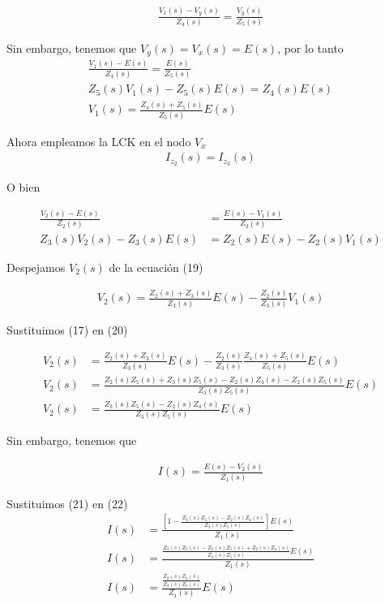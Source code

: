 \documentclass{article}
\begin{document}
\begin{align}
	\frac{V_1(s) - V_y(s)}{Z_4(s)} = \frac{V_y(s)}{Z_5(s)}
\end{align}

Sin embargo, tenemos que $V_y(s) = V_x(s) = E(s)$, por lo tanto
\begin{align}
	\frac{V_1(s) - E(s)}{Z_4(s)} = \frac{E(s)}{Z_5(s)} \nonumber \\
	Z_5(s)V_1(s) - Z_5(s)E(s) = Z_4(s)E(s) \nonumber \\
	V_1(s) = \frac{Z_4(s) + Z_5(s)}{Z_5(s)}E(s)
\end{align}

Ahora empleamos la LCK en el nodo $V_x$
\begin{align}
	I_{z_2}(s) = I_{z_3}(s)
\end{align}

O bien

\begin{align}
	\frac{V_2(s) - E(s)}{Z_2(s)} &= \frac{E(s) - V_1(s)}{Z_3(s)} \nonumber \\
	Z_3(s)V_2(s) - Z_3(s)E(s) &= Z_2(s)E(s) - Z_2(s)V_1(s)
\end{align}

Despejamos $V_2(s)$ de la ecuación (19)

\begin{align}
	V_2(s) = \frac{Z_2(s) + Z_3(s)}{Z_3(s)}E(s) - \frac{Z_2(s)}{Z_3(s)}V_1(s)
\end{align}

Sustituimos (17) en (20)

\begin{align}
	V_2(s) &= \frac{Z_2(s) + Z_3(s)}{Z_3(s)}E(s) - \frac{Z_2(s)}{Z_3(s)} \frac{Z_4(s) + Z_5(s)}{Z_5(s)}E(s) \nonumber \\
	V_2(s) &= \frac{Z_2(s)Z_5(s) + Z_3(s)Z_5(s) - Z_2(s)Z_4(s) - Z_2(s)Z_5(s) }{Z_3(s)Z_5(s)}E(s) \nonumber \\
	V_2(s) &= \frac{Z_3(s)Z_5(s) - Z_2(s)Z_4(s)}{Z_3(s)Z_5(s)}E(s)
\end{align}

Sin embargo, tenemos que

\begin{align}
	I(s) = \frac{E(s) - V_2(s)}{Z_1(s)}
\end{align}

Sustituimos (21) en (22)
\begin{align}
	I(s) &= \frac{ \left[ 1 - \frac{Z_3(s)Z_5(s) - Z_2(s)Z_4(s)}{Z_3(s)Z_5(s)} \right]E(s) }{Z_1(s)} \nonumber \\
	I(s) &= \frac{\frac{Z_3(s)Z_5(s) - Z_3(s)Z_5(s) + Z_2(s)Z_4(s)}{Z_3(s)Z_5(s)}E(s) }{Z_1(s)} \nonumber \\
	I(s) &= \frac{ \frac{Z_2(s)Z_4(s)}{Z_3(s)Z_5(s)} }{Z_1(s)}E(s)
\end{align}
\end{document}
